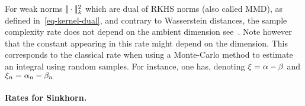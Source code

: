 For weak norms $|\!| \cdot |\!|^2_{k}$ which are dual of RKHS norms (also called MMD), as defined in~\eqref{eq-kernel-dual}, and contrary to Wasserstein distances, the sample complexity rate does not depend on the ambient dimension 
see~\cite{sriperumbudur2012empirical}. Note however that the constant appearing in this rate might depend on the dimension. 
%
This corresponds to the classical rate when using a Monte-Carlo method to estimate an integral using random samples. 
% 
For instance, one has, denoting $\xi=\alpha-\beta$ and $\xi_n=\alpha_n-\beta_n$


%
%



\paragraph{Rates for Sinkhorn.}



